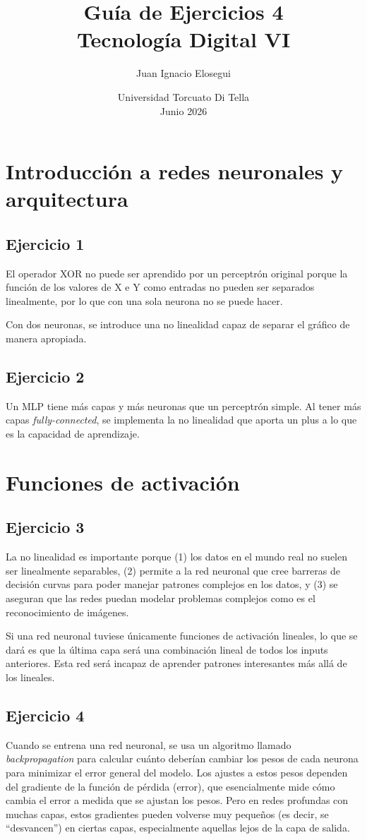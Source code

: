 \documentclass[a4paper,11pt]{article}
\title{\vspace{-2cm}\textbf{Guía de Ejercicios 4}\\[0.2cm]
\large Tecnología Digital VI}
\author{Juan Ignacio Elosegui}
\date{Universidad Torcuato Di Tella \\ Junio 2026}
\begin{document}
\maketitle

\section*{Introducción a redes neuronales y arquitectura}
\subsection*{Ejercicio 1}
El operador XOR no puede ser aprendido por un perceptrón original porque la función de los valores de X e Y como entradas no pueden ser separados linealmente, por lo que con una sola neurona no se puede hacer.

Con dos neuronas, se introduce una no linealidad capaz de separar el gráfico de manera apropiada.
\subsection*{Ejercicio 2}
Un MLP tiene más capas y más neuronas que un perceptrón simple. Al tener más capas \textit{fully-connected}, se implementa la no linealidad que aporta un plus a lo que es la capacidad de aprendizaje.

\section*{Funciones de activación}
\subsection*{Ejercicio 3}
La no linealidad es importante porque (1) los datos en el mundo real no suelen ser linealmente separables, (2) permite a la red neuronal que cree barreras de decisión curvas para poder manejar patrones complejos en los datos, y (3) se aseguran que las redes puedan modelar problemas complejos como es el reconocimiento de imágenes.

Si una red neuronal tuviese únicamente funciones de activación lineales, lo que se dará es que la última capa será una combinación lineal de todos los inputs anteriores. Esta red será incapaz de aprender patrones interesantes más allá de los lineales.
\subsection*{Ejercicio 4}
Cuando se entrena una red neuronal, se usa un algoritmo llamado \textit{backpropagation} para calcular cuánto deberían cambiar los pesos de cada neurona para minimizar el error general del modelo. Los ajustes a estos pesos dependen del gradiente de la función de pérdida (error), que esencialmente mide cómo cambia el error a medida que se ajustan los pesos. Pero en redes profundas con muchas capas, estos gradientes pueden volverse muy pequeños (es decir, se ``desvancen'') en ciertas capas, especialmente aquellas lejos de la capa de salida.
\end{document}
